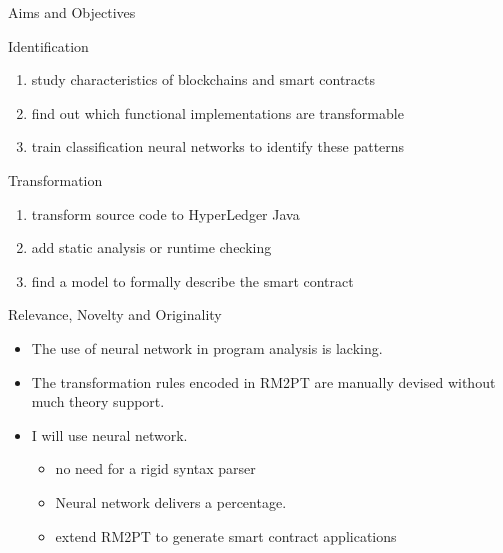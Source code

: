 \documentclass[xcolor=svgnames]{beamer}
\begin{document}
\begin{frame}{Aims and Objectives}

Identification\\
\begin{enumerate}
\item study characteristics of blockchains and smart contracts
\item find out which functional implementations are transformable
\item train classification neural networks to identify these patterns
\end{enumerate}

Transformation\\
\begin{enumerate}
\item transform source code to HyperLedger Java
\item add static analysis or runtime checking
\item find a model to formally describe the smart contract
\end{enumerate}

\end{frame}

\begin{frame}{Relevance, Novelty and Originality}
\begin{itemize}
\item The use of neural network in program analysis is lacking.
\item The transformation rules encoded in RM2PT are manually devised without much theory support.
\item I will use neural network.
\begin{itemize}
\item no need for a rigid syntax parser
\item Neural network delivers a percentage.
\item extend RM2PT to generate smart contract applications
\end{itemize}
\end{itemize}


\end{frame}
\end{document}
